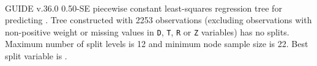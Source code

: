 \documentclass[12pt]{article}
\begin{document}
 \begin{center}
    ~{}
 \end{center}
GUIDE v.36.0 0.50-SE
piecewise constant least-squares regression tree
for predicting \texttt{}.
 Tree constructed with 2253 observations
 (excluding observations with non-positive weight or missing values
 in \texttt{D}, \texttt{T}, \texttt{R} or \texttt{Z} variables) has no splits.
 Maximum number of split levels is 12 and minimum node sample size is 22.
 Best split variable is \texttt{}.
 
\end{document}
